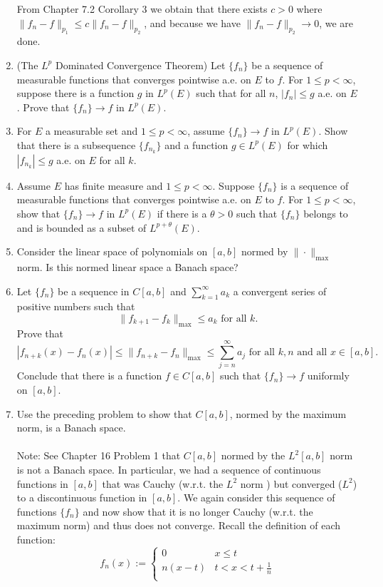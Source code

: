 \begin{enumerate}
	From Chapter 7.2 Corollary 3 we obtain that there exists $c>0$ where $\|f_n-f\|_{p_1}\le c\|f_n-f\|_{p_2}$, and because we have $\|f_n-f\|_{p_2}\to0$, we are done.
	\item (The $L^p$ Dominated Convergence Theorem) Let $\{f_n\}$ be a sequence of measurable functions that converges pointwise a.e. on $E$ to $f$.
	For $1\le p<\infty$, suppose there is a function $g$ in $L^p(E)$ such that for all $n$, $|f_n|\le g$ a.e. on $E$.
	Prove that $\{f_n\}\to f$ in $L^p(E)$.
	\item For $E$ a measurable set and $1\le p<\infty$, assume $\{f_n\}\to f$ in $L^p(E)$.
	Show that there is a subsequence $\{f_{n_k}\}$ and a function $g\in L^p(E)$ for which $|f_{n_k}|\le g$ a.e. on $E$ for all $k$.
	\item Assume $E$ has finite measure and $1\le p<\infty$.
	Suppose $\{f_n\}$ is a sequence of measurable functions that converges pointwise a.e. on $E$ to $f$.
	For $1\le p<\infty$, show that $\{f_n\}\to f$ in $L^p(E)$ if there is a $\theta>0$ such that $\{f_n\}$ belongs to and is bounded as a subset of $L^{p+\theta}(E)$.
	\item Consider the linear space of polynomials on $[a,b]$ normed by $\|\cdot\|_{\max}$ norm.
	Is this normed linear space a Banach space?
	\item Let $\{f_n\}$ be a sequence in $C[a,b]$ and $\sum_{k=1}^\infty a_k$ a convergent series of positive numbers such that
	\[
		\|f_{k+1}-f_k\|_{\max}\le a_k\text{ for all }k.
	\]
	Prove that
	\[
		|f_{n+k}(x)-f_n(x)|\le\|f_{n+k}-f_n\|_{\max}\le\sum_{j=n}^\infty a_j\text{ for all }k,n\text{ and all }x\in[a,b].
	\]
	Conclude that there is a function $f\in C[a,b]$ such that $\{f_n\}\to f$ uniformly on $[a,b]$.
	\item Use the preceding problem to show that $C[a,b]$, normed by the maximum norm, is a Banach space.\\
	\\Note: See Chapter 16 Problem 1 that $C[a,b]$ normed by the $L^2[a,b]$ norm is not a Banach space.
	In particular, we had a sequence of continuous functions in $[a,b]$ that was Cauchy (w.r.t. the $L^2$ norm ) but converged ($L^2$) to a discontinuous function in $[a,b]$.
	We again consider this sequence of functions $\{f_n\}$ and now show that it is no longer Cauchy (w.r.t. the maximum norm) and thus does not converge.
	Recall the definition of each function:
	\[
        f_n(x):=
        \begin{cases}
            0 &x\le t\\
            n(x-t)&t<x<t+\frac{1}{n}\\

\end{cases}\]
\end{enumerate}
